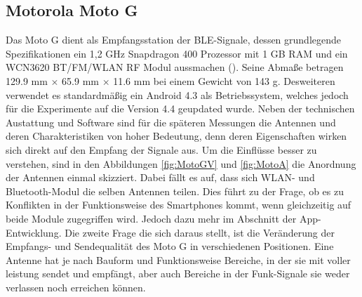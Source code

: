 \subsection{Motorola Moto G}
Das Moto G dient als Empfangsstation der BLE-Signale, dessen grundlegende Spezifikationen ein 1,2 GHz Snapdragon 400 Prozessor mit 1 GB RAM und ein WCN3620 BT/FM/WLAN RF Modul aussmachen (\cite{Moto}). Seine Abmaße betragen 129.9 mm $\times$ 65.9 mm $\times$ 11.6  mm bei einem Gewicht von 143 g. Desweiteren verwendet es standardmäßig ein Android 4.3 als Betriebssystem, welches jedoch für die Experimente auf die Version 4.4 geupdated wurde. Neben der technischen Austattung und Software sind für die späteren Messungen die Antennen und deren Charakteristiken von hoher Bedeutung, denn deren Eigenschaften wirken sich direkt auf den Empfang der Signale aus. Um die Einflüsse besser zu verstehen, sind in den Abbildungen \ref{fig:MotoGV} und \ref{fig:MotoA} die Anordnung der Antennen einmal skizziert. Dabei fällt es auf, dass sich WLAN- und Bluetooth-Modul die selben Antennen teilen. Dies führt zu der Frage, ob es zu Konflikten in der Funktionsweise des Smartphones kommt, wenn gleichzeitig auf beide Module zugegriffen wird. Jedoch dazu mehr im Abschnitt der App-Entwicklung. Die zweite Frage die sich daraus stellt, ist die Veränderung der Empfangs- und Sendequalität des Moto G in verschiedenen Positionen. Eine Antenne hat je nach Bauform und Funktionsweise Bereiche, in der sie mit voller leistung sendet und empfängt, aber auch Bereiche in der Funk-Signale sie weder verlassen noch erreichen können. 
